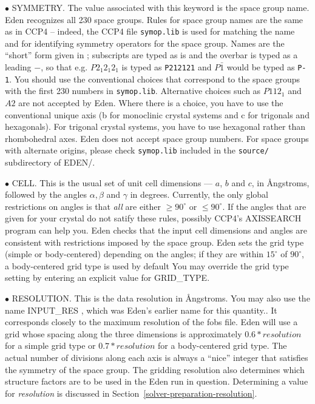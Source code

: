 \documentclass{report}
\begin{document}
\vspace {0.1in}

$\bullet$ SYMMETRY.
  The value associated with this keyword is the space 
group name.  Eden recognizes all 230 space groups.  
Rules for space group names are the same as in CCP4 \cite{ccp4} -- 
indeed, the CCP4 file {\tt symop.lib} is used for matching the name and for
identifying symmetry operators for the space group.
Names are the ``short'' form given in \cite{hahn}; subscripts are typed as is
and the overbar is typed as a leading $-$, 
so that e.g. $P2_{1}2_{1}2_{1}$ is typed as {\tt P212121}
and $P\bar{1}$ would be typed as {\tt P-1}.
You should use the conventional choices that correspond to the space groups
with the first 230 numbers in {\tt symop.lib}.  
Alternative choices such as $P112_{1}$ and $A2$ are not accepted by Eden.
Where there is a choice, you have to use the conventional unique axis
(b for monoclinic crystal systems and c for trigonals and hexagonals).
For trigonal crystal systems, you have to use 
hexagonal rather than rhombohedral axes.  Eden does not accept space group 
numbers.  For space groups with alternate origins, please check {\tt symop.lib}
included in the {\tt source/}~ subdirectory of EDEN/.

$\bullet$ CELL.
This is the usual set of unit cell dimensions --- $a$, $b$ and 
$c$, in \AA ngstroms, followed by the angles $\alpha, \beta$ 
and $\gamma$ in degrees.  Currently, the only
global restrictions on angles is that {\it all} are either $\geq 90^\circ$ or
$\leq 90^\circ$.
If the angles that are given for your crystal do not satify these rules,
possibly CCP4's AXISSEARCH \cite{ccp4} program can help you.
Eden checks that the input cell dimensions and angles are consistent with
restrictions imposed by the space group.  Eden sets the grid type (simple or
body-centered) depending on the angles; if they are within $15^\circ$ of 
$90^\circ$, a body-centered grid type is used by default  You may override the
grid type setting by entering an explicit value for 
GRID\_TYPE.

$\bullet$ RESOLUTION.  
This is the data resolution in \AA ngstroms.  You may also use the name
INPUT\_RES , which was Eden's earlier name for this
quantity..
It corresponds closely to the maximum resolution of the fobs file.
Eden will
use a grid whose spacing along the three dimensions  
is approximately
$0.6*resolution$ for a simple grid type or $0.7*resolution$ for a 
body-centered grid type.  The actual number of divisions along each axis
is always a ``nice'' integer that satisfies the symmetry of the space group.
The gridding resolution also determines 
which structure factors are to be used in the Eden run in question.
Determining a value for {\it resolution} is discussed in 
Section~\ref{solver-preparation-resolution}.
\end{document}

